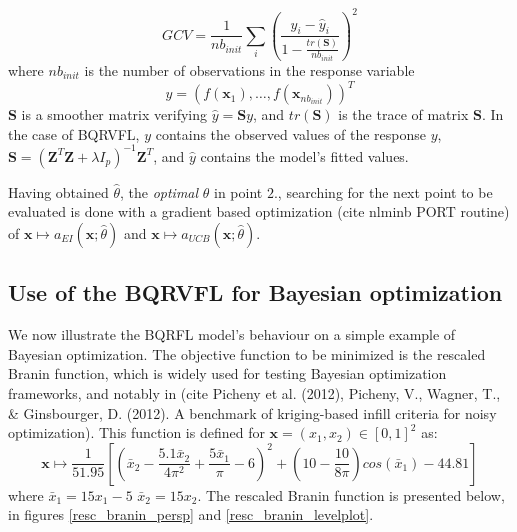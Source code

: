\begin{equation}
GCV = \frac{1}{nb_{init}}\sum_i \left( \frac{y_i - \hat{y}_i}{1 - \frac{tr(\textbf{S})}{nb_{init}}} \right)^2 
\end{equation}
where $nb_{init}$ is the number of observations in the response variable 
$$
y = \left( f(\textbf{x}_1), \ldots, f(\textbf{x}_{nb_{init}}) \right)^T
$$
$\textbf{S}$ is a smoother matrix verifying $\hat{y} = \textbf{S}y$, and $tr(\textbf{S})$ is the trace of matrix $\textbf{S}$. In the case of BQRVFL, $y$ contains the observed values of the response $y$, $\textbf{S} = \left(\textbf{Z}^T\textbf{Z} + \lambda I_p \right)^{-1}\textbf{Z}^T$, and $\hat{y}$ contains the model's fitted values. 

Having obtained $\hat{\theta}$, the \textit{optimal} $\theta$ in point $2.$, searching for the next point to be evaluated is done with a gradient based optimization (cite nlminb PORT routine) of $\textbf{x} \mapsto a_{EI}\left(\textbf{x}; \hat{\theta} \right)$ and $\textbf{x} \mapsto a_{UCB}\left(\textbf{x}; \hat{\theta}  \right)$. 

\subsection{Use of the BQRVFL for Bayesian optimization}

We now illustrate the BQRFL model's behaviour on a simple example of Bayesian optimization. The objective function to be minimized is the rescaled Branin function, which is widely used for testing Bayesian optimization frameworks, and notably in (cite Picheny et al. (2012), Picheny, V., Wagner, T., \& Ginsbourger, D. (2012). A benchmark of kriging-based infill criteria for noisy optimization). 
This function is defined for $\textbf{x} = (x_1, x_2) \in [0, 1]^2$ as: 
\begin{equation}
\textbf{x} \mapsto \frac{1}{51.95}\left[\left(\bar{x}_2 - \frac{5.1\bar{x}_2}{4 \pi^2} + \frac{5\bar{x}_1}{\pi}-6\right)^2  + \left(10 - \frac{10}{8\pi}\right)cos(\bar{x}_1) - 44.81 \right]
\end{equation}
where $\bar{x}_1 = 15 x_1 - 5$ $\bar{x}_2 = 15 x_2$. The rescaled Branin function is presented below, in figures \ref{resc_branin_persp} and \ref{resc_branin_levelplot}. 

